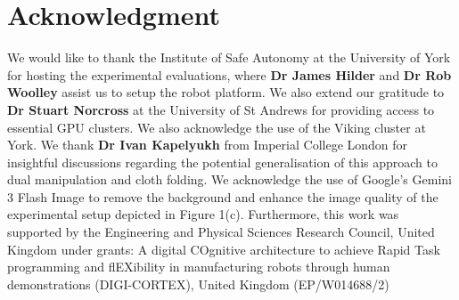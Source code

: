 \documentclass[journal]{IEEEtran}
\begin{document}
\section*{Acknowledgment}
We would like to thank the Institute of Safe Autonomy at the University of York for hosting the experimental evaluations, where \textbf{Dr James Hilder} and \textbf{Dr Rob Woolley} assist us to setup the robot platform. We also extend our gratitude to \textbf{Dr Stuart Norcross} at the University of St Andrews for providing access to essential GPU clusters. We also  acknowledge the use of the Viking cluster at York. We thank \textbf{Dr Ivan Kapelyukh} from Imperial College London for insightful discussions regarding the potential generalisation of this approach to dual manipulation and cloth folding. We acknowledge the use of Google's Gemini 3 Flash Image to remove the background and enhance the image quality of the experimental setup depicted in Figure 1(c). Furthermore, this work was supported by the Engineering and Physical Sciences Research Council, United Kingdom under grants: A digital COgnitive architecture to achieve Rapid Task programming and flEXibility in manufacturing robots through human demonstrations (DIGI-CORTEX), United Kingdom (EP/W014688/2)




\end{document}

